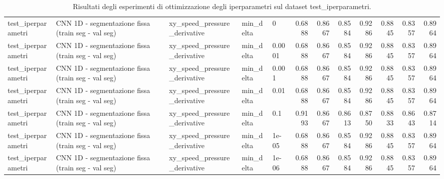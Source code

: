 \documentclass{article}
\begin{document}
\begin{table}[htbp]
\begin{adjustbox}{max width=\textwidth}
\begin{tabular}{lllllrrrrrrr}
test\_iperparametri & CNN 1D - segmentazione fissa (train seg - val seg) & xy\_speed\_pressure\_derivative & min\_delta & 0 & 0.6888 & 0.8667 & 0.8584 & 0.9286 & 0.8845 & 0.8357 & 0.8964 \\
test\_iperparametri & CNN 1D - segmentazione fissa (train seg - val seg) & xy\_speed\_pressure\_derivative & min\_delta & 0.0001 & 0.6888 & 0.8667 & 0.8584 & 0.9286 & 0.8845 & 0.8357 & 0.8964 \\
test\_iperparametri & CNN 1D - segmentazione fissa (train seg - val seg) & xy\_speed\_pressure\_derivative & min\_delta & 0.001 & 0.6888 & 0.8667 & 0.8584 & 0.9286 & 0.8845 & 0.8357 & 0.8964 \\
test\_iperparametri & CNN 1D - segmentazione fissa (train seg - val seg) & xy\_speed\_pressure\_derivative & min\_delta & 0.01 & 0.6888 & 0.8667 & 0.8584 & 0.9286 & 0.8845 & 0.8357 & 0.8964 \\
test\_iperparametri & CNN 1D - segmentazione fissa (train seg - val seg) & xy\_speed\_pressure\_derivative & min\_delta & 0.1 & 0.9193 & 0.8667 & 0.8613 & 0.8750 & 0.8833 & 0.8643 & 0.8714 \\
test\_iperparametri & CNN 1D - segmentazione fissa (train seg - val seg) & xy\_speed\_pressure\_derivative & min\_delta & 1e-05 & 0.6888 & 0.8667 & 0.8584 & 0.9286 & 0.8845 & 0.8357 & 0.8964 \\
test\_iperparametri & CNN 1D - segmentazione fissa (train seg - val seg) & xy\_speed\_pressure\_derivative & min\_delta & 1e-06 & 0.6888 & 0.8667 & 0.8584 & 0.9286 & 0.8845 & 0.8357 & 0.8964 \\
\bottomrule
\end{tabular}

\end{adjustbox}

\caption{Risultati degli esperimenti di ottimizzazione degli iperparametri sul dataset test\_iperparametri.}
\label{tab:hyperparameter_results}

\end{table}
\end{document}
